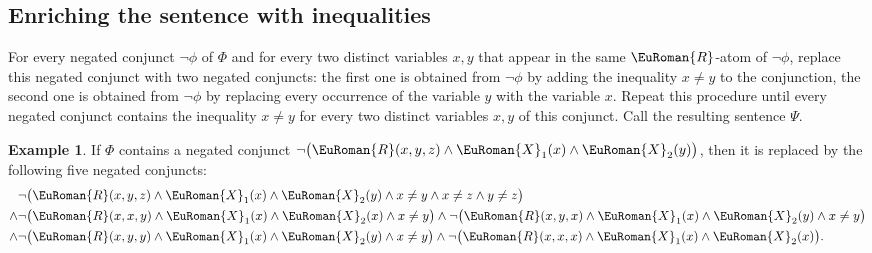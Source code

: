 \documentclass[10pt,a4paper]{amsart}
\theoremstyle{plain}
\theoremstyle{definition}
\newtheorem{exa}[thm]{Example}
\numberwithin{equation}{section}
\newcommand{\eurm}[1]{\EuRoman{#1}} %
\newcommand{\rel}[1]{\eurm{#1}} %
\begin{document}
\subsection*{Enriching the sentence with inequalities} 
For every negated conjunct $\neg\phi$ of  $\Phi$ and for every two distinct variables $x,y$ that appear in the same $\rel{R}$-atom of $\neg\phi$,  replace this negated conjunct with two negated conjuncts: the first one is obtained from $\neg\phi$ by adding the inequality $x\not=y$ to the conjunction, the second one is obtained from $\neg\phi$ by replacing every occurrence of the variable $y$ with the variable $x$.
%
Repeat this procedure until every negated conjunct contains the inequality $x\not=y$ for every two distinct variables $x,y$ of this conjunct. Call the resulting sentence $\Psi$.

\begin{exa} \label{example:enriching_inequalities}
If $\Phi$ contains a negated conjunct $\neg\bigl(\rel{R}(x,y,z)\wedge\rel{X}_1(x)\wedge\rel{X}_2(y)\bigr)$, then it is replaced by the following five negated conjuncts: 
\begin{align*}
&\neg\bigl(\rel{R}(x,y,z)\wedge\rel{X}_1(x)\wedge\rel{X}_2(y)\wedge x\not=y \wedge x\not=z\wedge y\not=z\bigr)\\
\wedge &\neg\bigl(\rel{R}(x,x,y)\wedge\rel{X}_1(x)\wedge\rel{X}_2(x)\wedge x\not=y\bigr)\wedge \neg\bigl(\rel{R}(x,y,x)\wedge\rel{X}_1(x)\wedge\rel{X}_2(y)\wedge x\not=y\bigr)\\
\wedge &\neg\bigl(\rel{R}(x,y,y)\wedge\rel{X}_1(x)\wedge\rel{X}_2(y)\wedge x\not=y\bigr)\wedge \neg\bigl(\rel{R}(x,x,x)\wedge\rel{X}_1(x)\wedge\rel{X}_2(x)\bigr).
\end{align*}
\end{exa}
\end{document}
